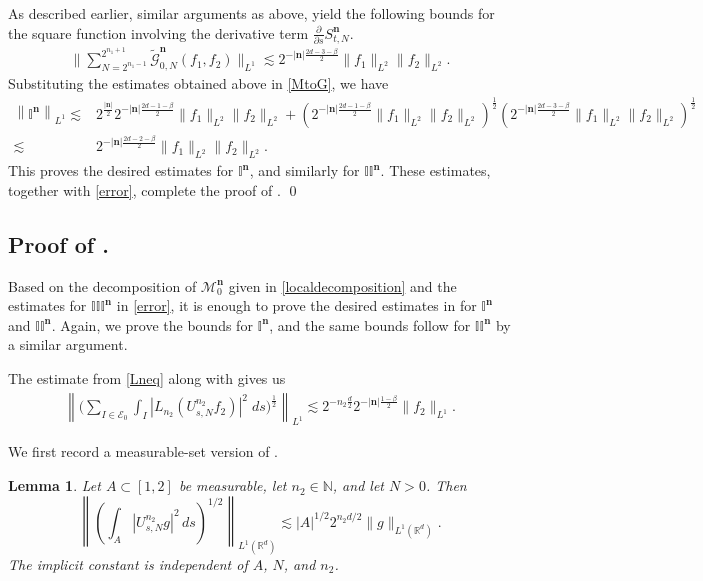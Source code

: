 \documentclass[a4paper,reqno]{amsart}
\newtheorem{lemma}{Lemma}[section]
\numberwithin{equation}{section}
\begin{document}
	As described earlier, similar arguments as above, yield the following bounds for the square function involving the derivative term $\frac{\partial}{\partial s}S^{\mathbf{n}}_{t,N}$.
	\begin{align*}
		\Bigg\|\sum_{N=2^{n_1-1}}^{2^{n_1+1}}\tilde{\mathcal{G}}^{\mathbf{n}}_{0,N}(f_1,f_2)\Bigg\|_{L^1}\lesssim2^{-|\mathbf{n}|\frac{2d-3-\beta}{2}}\|f_1\|_{L^2}\|f_2\|_{L^2}.
	\end{align*}
	Substituting the estimates obtained above in \eqref{MtoG}, we have
	\begin{align*}
		\left\|\mathbb{I}^{\mathbf{n}}\right\|_{L^1}\lesssim& 2^{\frac{|\mathbf{n}|}{2}}2^{-|\mathbf{n}|\frac{2d-1-\beta}{2}}\|f_1\|_{L^2}\|f_2\|_{L^2}+\left(2^{-|\mathbf{n}|\frac{2d-1-\beta}{2}}\|f_1\|_{L^2}\|f_2\|_{L^2}\right)^{\frac{1}{2}}\left(2^{-|\mathbf{n}|\frac{2d-3-\beta}{2}}\|f_1\|_{L^2}\|f_2\|_{L^2}\right)^{\frac{1}{2}}\\
		\lesssim &2^{-|\mathbf{n}|\frac{2d-2-\beta}{2}}\|f_1\|_{L^2}\|f_2\|_{L^2}.
	\end{align*}
	This proves the desired estimates for $\mathbb{I}^{\mathbf{n}}$, and similarly for $\mathbb{II}^{\mathbf{n}}$. These estimates, together with \eqref{error}, complete the proof of . \qed
	
	\subsection{Proof of .}
	Based on the decomposition of $\mathcal{M}^{\mathbf{n}}_0$ given in \eqref{localdecomposition} and the estimates for $\mathbb{III}^{\mathbf{n}}$ in \eqref{error}, it is enough to prove the desired estimates in  for $\mathbb{I}^{\mathbf{n}}$ and $\mathbb{II}^{\mathbf{n}}$. Again, we prove the bounds for $\mathbb{I}^{\mathbf{n}}$, and the same bounds follow for $\mathbb{II}^{\mathbf{n}}$ by a similar argument.
	
	The estimate from \eqref{Lneq} along with  gives us 
	\begin{align}\label{U1}
		\left\|\bigg(\sum_{I\in \mathcal{E}_0}\int_I\left|L_{n_2}\left(U_{s,N}^{n_2}f_2\right)\right|^2\;ds\bigg)^\frac{1}{2}\right\|_{L^1}\lesssim2^{-n_2\frac{d}{2}}2^{-|\mathbf{n}|\frac{1-\beta}{2}}\|f_2\|_{L^1}.
	\end{align}
	
	
	
	We first record a measurable-set version of .
	
	\begin{lemma}\label{u1-measurable}
		Let \(A\subset[1,2]\) be measurable, let \(n_2\in\mathbb N\),
		and let \(N>0\). Then
		\begin{equation}\label{u1-set}
			\left\|
			\left(
			\int_A |U_{s,N}^{n_2}g|^2\,ds
			\right)^{1/2}
			\right\|_{L^1(\mathbb R^d)}
			\lesssim
			|A|^{1/2}2^{n_2d/2}\|g\|_{L^1(\mathbb R^d)}.
		\end{equation}
		The implicit constant is independent of \(A\), \(N\), and \(n_2\).
	\end{lemma}
	
\end{document}
